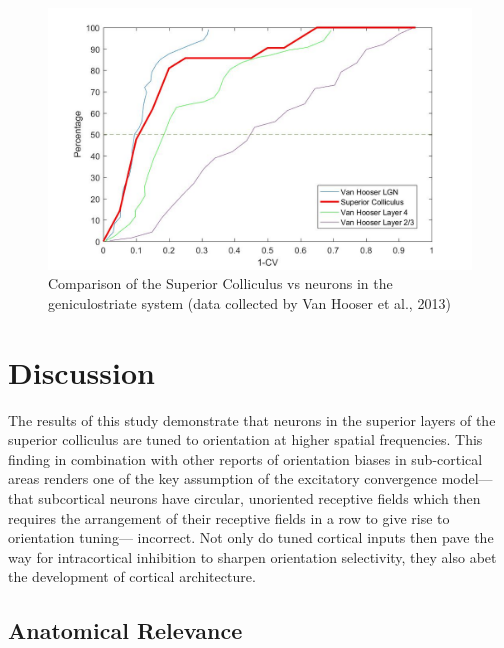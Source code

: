 \documentclass [12pt]{report}
\begin{document}
	\begin{figure}
		\includegraphics[width=\linewidth]{SCvgeniculostriate.jpg}
		\caption{ Comparison of the Superior Colliculus vs neurons in the geniculostriate system (data collected by Van Hooser et al., 2013)}
		\label{fig:fig7}			
	\end{figure}
	
	\section{Discussion}
	The results of this study demonstrate that neurons in the superior layers of the superior colliculus are tuned to orientation at higher spatial frequencies. This finding in combination with other reports of orientation biases in sub-cortical areas renders one of the key assumption of the excitatory convergence model— that subcortical neurons have circular, unoriented receptive fields which then requires the arrangement of their receptive fields in a row to give rise to orientation tuning— incorrect. Not only do tuned cortical inputs then pave the way for intracortical inhibition to sharpen orientation selectivity, they also abet the development of cortical architecture.
	
	\subsection{Anatomical Relevance}
	
\end{document}
